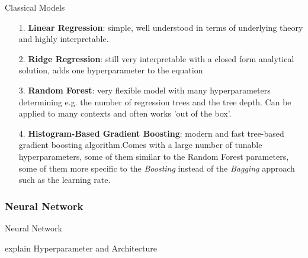 \documentclass[ngerman,inputenc]{beamer}
\begin{document}
\begin{frame}{Classical Models}

  \begin{itemize}
  \item[1.] \textbf{Linear Regression}: simple, well understood in terms of underlying theory and highly interpretable.
  \item[2.] \textbf{Ridge Regression}: still very interpretable with a closed form analytical solution, adds one hyperparameter to the equation
  \item[3.] \textbf{Random Forest}: very flexible model with many hyperparameters determining e.g. the number of regression trees and the tree depth. Can be applied to many contexts and often works 'out of the box'.
  \item[4.] \textbf{Histogram-Based Gradient Boosting}: modern and fast tree-based gradient boosting algorithm.Comes with a large number of tunable hyperparameters, some of them similar to the Random Forest parameters, some of them more specific to the \emph{Boosting} instead of the \emph{Bagging} approach such as the learning rate. 
\end{itemize}
    
\end{frame}


\subsubsection{Neural Network}

\begin{frame}{Neural Network}

explain Hyperparameter and Architecture
      
\end{frame}
\end{document}
